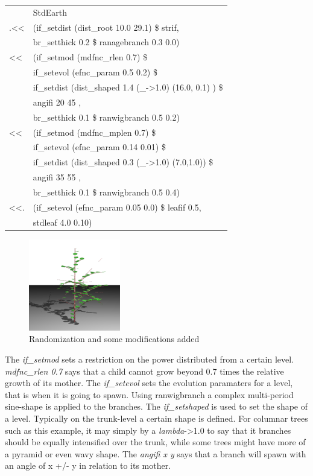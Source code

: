 \begin{tabular}{ll}
    &StdEarth\\
    .<<&(if\_setdist (dist\_root 10.0 29.1) \$ strif,\\ 
    &br\_setthick 0.2 \$ ranagebranch 0.3 0.0)\\
    <<&(if\_setmod (mdfnc\_rlen 0.7)  \$ \\
    &if\_setevol (efnc\_param 0.5 0.2) \$ \\
    &if\_setdist (dist\_shaped 1.4 (\_->1.0) (16.0, 0.1) ) \$ \\
    &angifi 20 45 , \\
    &br\_setthick 0.1 \$ ranwigbranch 0.5 0.2)\\
    <<&(if\_setmod (mdfnc\_mplen 0.7)  \$ \\
    &if\_setevol (efnc\_param 0.14 0.01) \$ \\
    &if\_setdist (dist\_shaped 0.3 (\_->1.0) (7.0,1.0)) \$ \\
    &angifi 35 55 , \\
    &br\_setthick 0.1 \$ ranwigbranch 0.5 0.4) \\
    <<.&(if\_setevol (efnc\_param 0.05 0.0) \$ leafif 0.5, \\
    &stdleaf 4.0 0.10) \\
 
\end{tabular}

\begin{figure}[htb]
        \centering
        \includegraphics[height=4cm,width=4cm, angle=0]{images/dbex2}
        \caption{Randomization and some modifications added}
        \label{fig:graph4}
\end{figure}

    The \emph{if\_setmod} sets a restriction on the power distributed from a
    certain level. \emph{mdfnc\_rlen 0.7} says that a child cannot grow beyond
    0.7 times the relative growth of its mother. The \emph{if\_setevol} sets the
    evolution paramaters for a level, that is when it is going to spawn. Using
    ranwigbranch a complex multi-period sine-shape is applied to the branches.
    The \emph{if\_setshaped} is used to set the shape of a level. Typically on
    the trunk-level a certain shape is defined. For columnar trees such as this
    example, it may simply by a \emph{lambda}->1.0 to say that it branches should be
    equally intensified over the trunk, while some trees might have more of a
    pyramid or even wavy shape. The \emph{angifi x y} says that a branch will
    spawn with an angle of x +/- y in relation to its mother. 

